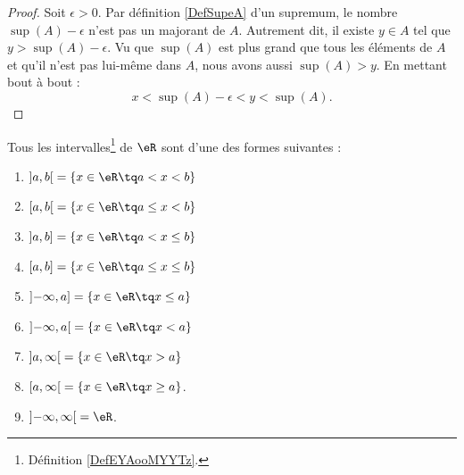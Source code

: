 \begin{proof}
	Soit \( \epsilon>0\). Par définition \ref{DefSupeA} d'un supremum, le nombre \( \sup(A)-\epsilon\) n'est pas un majorant de \( A\). Autrement dit, il existe \( y\in A\) tel que \( y>\sup(A)-\epsilon\). Vu que \( \sup(A)\) est plus grand que tous les éléments de \( A\) et qu'il n'est pas lui-même dans \( A\), nous avons aussi \( \sup(A)>y\). En mettant bout à bout :
	\begin{equation}
		x<\sup(A)-\epsilon<y<\sup(A).
	\end{equation}
\end{proof}

\begin{proposition}     \label{PROPooHPMWooQJXCAS}
	Tous les intervalles\footnote{Définition \ref{DefEYAooMYYTz}.} de \( \eR\) sont d'une des formes suivantes :
	\begin{enumerate}
		\item
		      \( \mathopen] a , b \mathclose[=\{ x\in \eR\tq a<x<b \}\)
		\item
		      \( \mathopen[ a , b \mathclose[=\{ x\in \eR\tq a\leq x<b \}\)
		\item
		      \( \mathopen] a , b \mathclose]=\{ x\in \eR\tq a<x\leq b \}\)
		\item
		      \( \mathopen[ a , b \mathclose]=\{ x\in \eR\tq a\leq x\leq b \}\)
		\item
		      \( \mathopen]-\infty , a \mathclose]=\{ x\in \eR\tq x\leq a \}\)
		\item
		      \( \mathopen]-\infty , a \mathclose[=\{ x\in \eR\tq x< a \}\)
		\item
		      \( \mathopen] a , \infty \mathclose[=\{ x\in \eR\tq x>a \}\)
		\item
		      \( \mathopen[ a , \infty \mathclose[=\{ x\in \eR\tq x\geq a \}\).
		\item
		      \( \mathopen] -\infty , \infty \mathclose[=\eR\).
	\end{enumerate}
\end{proposition}

